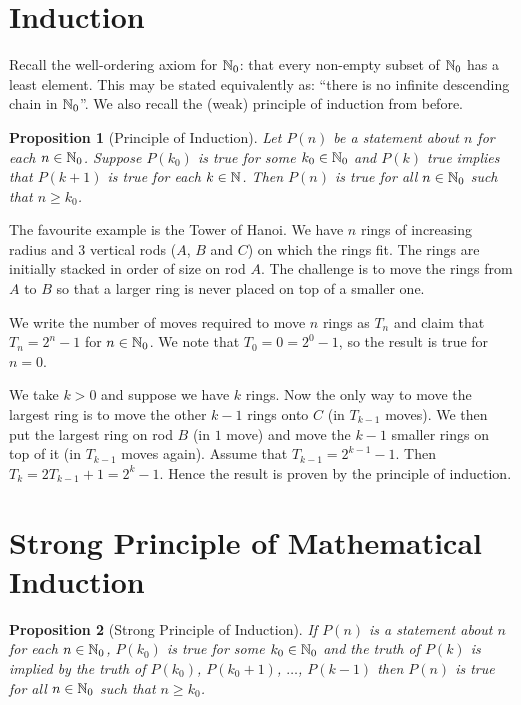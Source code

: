 \documentclass{notes}
\theoremstyle{plain}
\newtheorem*{proposition}{Proposition}
\begin{document}
\section{Induction}

Recall the well-ordering axiom for $\mathbb{N}_0$: that every non-empty subset
of $\mathbb{N}_0$ has a least element.  This may be stated equivalently as:
``there is no infinite descending chain in $\mathbb{N}_0$''.  We also recall
the (weak) principle of induction from before.

\begin{proposition}[Principle of Induction]
Let $P(n)$ be a statement about $n$ for each $n \in \mathbb{N}_0$.  Suppose
$P(k_0)$ is true for some $k_0 \in \mathbb{N}_0$ and $P(k)$ true implies that
$P(k+1)$ is true for each $k \in \mathbb{N}$.  Then $P(n)$ is true for all
$n \in \mathbb{N}_0$ such that $n \ge k_0$.
\end{proposition}

The favourite example is the Tower of Hanoi.  We have $n$ rings of
increasing radius and 3 vertical rods ($A$, $B$ and $C$) on which the rings
fit.  The rings are initially stacked in order of size on rod $A$. The
challenge is to move the rings from $A$ to $B$ so that a larger ring
is never placed on top of a smaller one.

We write the number of moves required to move $n$ rings as $T_n$ and claim
that $T_n = 2^n - 1$ for $n \in \mathbb{N}_0$.  We note that $T_0 = 0 = 2^0 - 1$,
so the result is true for $n = 0$.

We take $k > 0$ and suppose we have $k$ rings.  Now the only way to move the
largest ring is to move the other $k - 1$ rings onto $C$ (in $T_{k-1}$ moves).
We then put the largest ring on rod $B$ (in $1$ move) and move the $k-1$
smaller rings on top of it (in $T_{k-1}$ moves again).  Assume that
$T_{k-1} = 2^{k-1} - 1$.  Then $T_k = 2 T_{k-1} + 1
= 2^k - 1$.  Hence the result is proven by the principle of induction.

\section{Strong Principle of Mathematical Induction}

\begin{proposition}[Strong Principle of Induction]
If $P(n)$ is a statement about $n$ for each $n \in \mathbb{N}_0$,
$P(k_0)$ is true for some $k_0 \in \mathbb{N}_0$ and the truth of
$P(k)$ is implied by the truth of $P(k_0)$, $P(k_0+1)$, $\dots$, $P(k-1)$
then $P(n)$ is true for all $n \in \mathbb{N}_0$ such that $n \ge k_0$.
\end{proposition}
\end{document}
